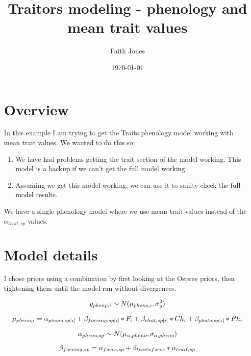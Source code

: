 \documentclass{article}
\begin{document}



\title{Traitors modeling - phenology and mean trait values}
\author{Faith Jones}
\date{\today}
\maketitle 

\section{Overview}
In this example I am trying to get the Traits phenology model working with mean trait values. We wanted to do this so:
\begin{enumerate}
	\item We have had problems getting the trait section of the model working. This model is a backup if we can't get the full model working
	\item Assuming we get this model working, we can use it to sanity check the full model results.
\end{enumerate}

We have a single phenology model where we use mean trait values instead of the $\alpha_{trait,sp}$ values.

\section{Model details}
I chose priors using a combination by first looking at the Ospree priors, then tightening them until the model ran without divergences. 

\begin{equation}
y_{phenp,i} \sim N(\mu_{pheno, i},\sigma^2_{y})\\
\end{equation}

\begin{equation}
\mu_{pheno, i} = \alpha_{pheno,sp[i]} + \beta_{forcing,sp[i]}*F_i + \beta_{chill,sp[i]}*Ch_i+ \beta_{photo,sp[i]}*Ph_i\\
\end{equation}

\begin{equation}
\alpha_{pheno,sp} \sim N(\mu_{\alpha, pheno}, \sigma_{\alpha, pheno})\\
\end{equation}


\begin{equation}
\beta_{forcing,sp} = \alpha_{force,sp} + \beta_{trait x force}*\alpha_{trait, sp} \\
\end{equation}
\end{document}
